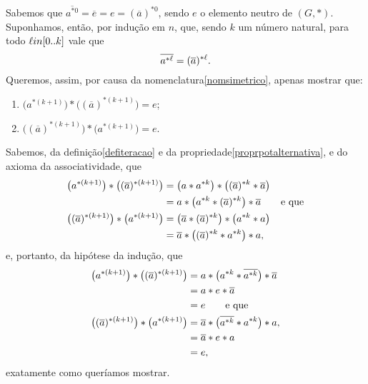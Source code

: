 \begin{dem}
  Sabemos que $\overline{a^{\ast 0}} = \overline{e} = e =
  (\overline{a})^{\ast 0}$, sendo $e$ o elemento neutro de $(G,\ast)$.
  Suponhamos, então, por indução em $n$, que, sendo $k$ um número
  natural,
  para todo $\ell\\in[0..k]$ vale que
  \begin{equation*}
    \overline{a^{\ast \ell}} = (\overline{a})^{\ast \ell}\mathrm{.}
  \end{equation*}
  Queremos, assim, por causa da nomenclatura\xspace\ref{nomsimetrico},
  apenas mostrar que:
  \begin{enumerate}
    \item $\bigl(a^{\ast (k+1)}\bigr)\ast
      \bigl((\overline{a})^{\ast (k+1)}\bigr) = e$;
    \item $\bigl((\overline{a})^{\ast (k+1)}\bigr)\ast
      \bigl(a^{\ast (k+1)}\bigr) = e$.
  \end{enumerate}
  Sabemos, da definição\xspace\ref{defiteracao} e da
  propriedade\xspace\ref{proprpotalternativa}, e do axioma da
  associatividade,
  que
  \begin{equation*}
    \begin{aligned}
      \bigl(a^{\ast (k+1)}\bigr)\ast
      \bigl((\overline{a})^{\ast (k+1)}\bigr) &=
      \bigl(a\ast a^{\ast k}\bigr)\ast
      \bigl((\overline{a})^{\ast k}\ast \overline{a}\bigr) \\&=
      a\ast
      \bigl(a^{\ast k}\ast (\overline{a})^{\ast k}\bigr)
      \ast \overline{a}\qquad\text{e que}\\
      \bigl((\overline{a})^{\ast (k+1)}\bigr)\ast
      \bigl(a^{\ast (k+1)}\bigr) &=
      \bigl(\overline{a}\ast (\overline{a})^{\ast k}\bigr)\ast
      \bigl(a^{\ast k}\ast a\bigr) \\&=
      \overline{a}\ast
      \bigl((\overline{a})^{\ast k}\ast a^{\ast k}\bigr)
      \ast a\mathrm{,}
    \end{aligned}
  \end{equation*}
  e, portanto, da hipótese da indução, que
  \begin{equation*}
    \begin{aligned}
      \bigl(a^{\ast (k+1)}\bigr)\ast
      \bigl((\overline{a})^{\ast (k+1)}\bigr) &=
      a\ast
      \bigl(a^{\ast k}\ast \overline{a^{\ast k}}\bigr)
      \ast \overline{a} \\&=
      a\ast e\ast\overline{a} \\&=e\qquad\text{e que}\\
      \bigl((\overline{a})^{\ast (k+1)}\bigr)\ast
      \bigl(a^{\ast (k+1)}\bigr) &=
      \overline{a}\ast
      \bigl(\overline{a^{\ast k}}\ast a^{\ast k}\bigr)
      \ast a\mathrm{,}\\&=
      \overline{a}\ast e\ast a\\&= e\mathrm{,}
    \end{aligned}
  \end{equation*}
  exatamente como queríamos mostrar.
\end{dem}

